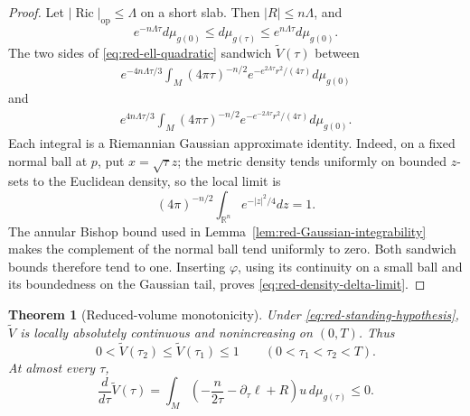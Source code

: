 \documentclass[10pt]{coll-l}
\newtheorem{theorem}{Theorem}[chapter]
\theoremstyle{definition}
\theoremstyle{remark}
\numberwithin{section}{chapter}
\numberwithin{equation}{chapter}
\newcommand{\Ric}{\operatorname{Ric}}
\begin{document}
\begin{proof}
Let $|\Ric|_{\mathrm{op}}\leq\Lambda$ on a short slab.  Then
$|R|\leq n\Lambda$, and
\begin{equation}
 e^{-n\Lambda\tau}d\mu_{g(0)}
 \leq d\mu_{g(\tau)}
 \leq e^{n\Lambda\tau}d\mu_{g(0)}.                    \label{eq:red-measure-comparison}
\end{equation}
The two sides of \eqref{eq:red-ell-quadratic} sandwich
$\widetilde V(\tau)$ between
\begin{align}
 e^{-4n\Lambda\tau/3}
 \int_M(4\pi\tau)^{-n/2}
   e^{-e^{2\Lambda\tau}r^2/(4\tau)}d\mu_{g(0)}          \label{eq:red-volume-sandwich-lower}
\end{align}
and
\begin{align}
 e^{4n\Lambda\tau/3}
 \int_M(4\pi\tau)^{-n/2}
   e^{-e^{-2\Lambda\tau}r^2/(4\tau)}d\mu_{g(0)}.       \label{eq:red-volume-sandwich-upper}
\end{align}
Each integral is a Riemannian Gaussian approximate identity.  Indeed, on a
fixed normal ball at $p$, put $x=\sqrt\tau z$; the metric density tends
uniformly on bounded $z$-sets to the Euclidean density, so the local limit is
\begin{equation}
 (4\pi)^{-n/2}\int_{\mathbb R^n}e^{-|z|^2/4}dz=1.        \label{eq:red-Euclidean-Gaussian-mass}
\end{equation}
The annular Bishop bound used in
Lemma~\ref{lem:red-Gaussian-integrability} makes the complement of the
normal ball tend uniformly to zero.  Both sandwich bounds therefore tend to
one.  Inserting $\varphi$, using its continuity on a small ball and its
boundedness on the Gaussian tail, proves
\eqref{eq:red-density-delta-limit}.
\end{proof}

\begin{theorem}[Reduced-volume monotonicity]
\label{thm:red-volume-monotonicity}
Under \eqref{eq:red-standing-hypothesis}, $\widetilde V$ is locally
absolutely continuous and nonincreasing on $(0,T)$.  Thus
\begin{equation}
 0<\widetilde V(\tau_2)\leq\widetilde V(\tau_1)\leq1
 \qquad(0<\tau_1<\tau_2<T).                            \label{eq:red-volume-monotone}
\end{equation}
At almost every $\tau$,
\begin{equation}
 \frac d{d\tau}\widetilde V(\tau)
 =\int_M\left(-\frac n{2\tau}-\partial_\tau\ell+R\right)
               u\,d\mu_{g(\tau)}\leq0.                 \label{eq:red-volume-derivative}
\end{equation}
\end{theorem}
\end{document}
